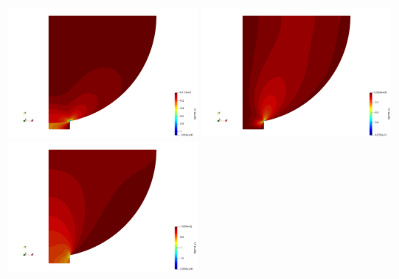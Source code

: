 \begin{center}
\includegraphics[width=5cm]{python_codes/fieldstone_63/results/sigmaxx}
\includegraphics[width=5cm]{python_codes/fieldstone_63/results/sigmaxy}
\includegraphics[width=5cm]{python_codes/fieldstone_63/results/sigmayy}
\end{center}


